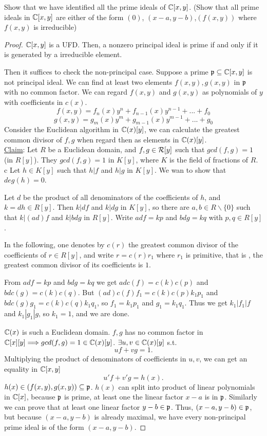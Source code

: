 \begin{exr}
Show that we have identified all the prime ideals of $\mathbb C[x,y]$. (Show that all prime ideals in $\mathbb C[x,y]$ are either of the form $(0)$, $(x-a,y-b)$,$(f(x,y))$ where $f(x,y)$ is irreducible)
\end{exr}
\begin{proof} $\mathbb C[x,y]$ is a UFD. Then, a nonzero principal ideal is prime if and only if it is generated by a irreducible element.

Then it suffices to check the  non-principal case. Suppose a prime ${\mathfrak p}\subseteq \mathbb C[x,y]$ is not principal ideal. We can find at least two elements $f(x,y), g(x,y)$ in ${\mathfrak p}$ with no common factor. We can regard $f(x,y)$ and $g(x,y)$ as polynomials of $y$ with coefficients in $c(x)$.
$$
f(x,y)=f_n(x)y^n+f_{n-1}(x)y^{n-1}+...+f_0
$$
$$
g(x,y)=g_m(x)y^m+g_{m-1}(x)y^{m-1}+...+g_0
$$
Consider the Euclidean algorithm in $\mathbb C(x)[y]$, we can calculate the greatest common divisor of $f,g$ when regard then as elements in $\mathbb C(x)[y]$. \\
\underline{Claim}: Let $R$ be a Euclidean domain, and $f,g\in{\cal R}[y]$ such that $gcd(f,g)=1$ (in $R[y]$). They $gcd(f,g)=1$ in $K[y]$, where $K$ is the field of fractions of $R$.
 c
Let $h\in K[y]$ such that $h|f$ and $h|g$ in $K[y]$. We wan to show that $deg (h)=0$.

Let $d$ be the product of all denominators of the coefficients of $h$, and $k=dh\in R[y]$. Then $k|df$ and $k|dg$ in $K[y]$, so there are $a,b\in R\backslash\{0\}$ such that $k|(ad)f$ and $k|bdg$ in $R[y]$. Write $adf=kp$ and $bdg=kq$ with $p,q\in R[y]$.

In the following, one denotes by $c(r)$ the greatest common divisor of the coefficients of $r\in R[y]$, and write $r=c(r)r_1$ where $r_1$ is primitive, that is , the greatest common divisor of its coefficients is $1$.

From $adf=kp$ and $bdg=kq$ we get $ad c(f)=c(k)c(p)$ and $bd c(g)=c(k)c(q)$. But $(ad)c(f)f_1=c(k)c(p)k_1p_1$ and $bd c(g)g_1=c(k)c(q)k_1q_1$, so $f_1=k_1p_1$ and $g_1=k_1q_1$. Thus we get $k_1 |f_1|f$ and $k_1|g_1|g$, so $k_1=1$, and we are done.

$\mathbb C(x)$ is such a Euclidean domain. $f,g$ has no common factor in $\mathbb C[x][y]\Longrightarrow gcd(f,g)=1\in \mathbb C(x)[y]$.
$\exists u,v\in \mathbb C(x)[y]$ s.t. 
$$
u f+vg=1.
$$
Multiplying the product of denominators of coefficients in $u,v$, we can get an equality in $\mathbb C[x,y]$
$$
u'f+v'g=h(x).
$$
$h(x)\in (f(x,y),g(x,y))\subseteq{\mathfrak p}$. $h(x)$ can split into product of linear polynomials in $\mathbb C[x]$, because ${\mathfrak p}$ is prime, at least one the linear factor $x-a$ is in ${\mathfrak p}$. Similarly we can prove that at least one linear factor $y-b\in {\mathfrak p}$. Thus, $(x-a,y-b)\in{\mathfrak p}$, but because $(x-a,y-b)$ is already maximal, we have every non-principal prime ideal is of the form $(x-a,y-b)$.
\end{proof}

